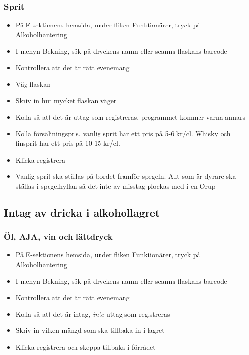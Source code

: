 \documentclass[10pt]{article}
\begin{document}
\subsubsection*{Sprit}
\begin{itemize}
	\item På E-sektionens hemsida, under fliken Funktionärer, tryck på Alkoholhantering
    \item I menyn Bokning, sök på dryckens namn eller scanna flaskans barcode
    \item Kontrollera att det är rätt evenemang
     \item Väg flaskan
    \item Skriv in hur mycket flaskan väger
    \item Kolla så att det är uttag som registreras, programmet kommer varna annars
    \item Kolla försäljningspris, vanlig sprit har ett pris på 5-6 kr/cl. Whisky och finsprit har ett pris på 10-15 kr/cl.
    \item Klicka registrera
    \item Vanlig sprit ska ställas på bordet framför spegeln. Allt som är dyrare ska ställas i spegelhyllan så det inte av misstag plockas med i en Orup
\end{itemize}

\subsection{Intag av dricka i alkohollagret}
\subsubsection*{Öl, AJA, vin och lättdryck}
\begin{itemize}
	\item På E-sektionens hemsida, under fliken Funktionärer, tryck på Alkoholhantering
    \item I menyn Bokning, sök på dryckens namn eller scanna flaskans barcode
    \item Kontrollera att det är rätt evenemang
    \item Kolla så att det är intag, \textit{inte} uttag som registreras
    \item Skriv in vilken mängd som ska tillbaka in i lagret
    \item Klicka registrera och skeppa tillbaka i förrådet

\end{itemize}
\end{document}
